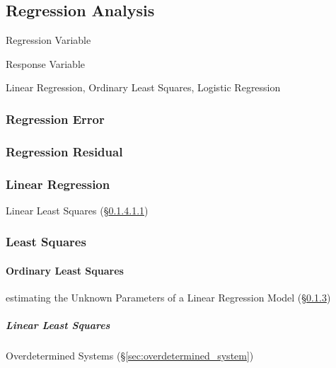 


\subsection{Regression Analysis}\label{sec:regression_analysis}

Regression Variable

Response Variable


Linear Regression, Ordinary Least Squares, Logistic Regression



\subsubsection{Regression Error}\label{sec:regression_error}

\subsubsection{Regression Residual}\label{sec:regression_residual}

\subsubsection{Linear Regression}\label{sec:linear_regression}

Linear Least Squares (\S\ref{sec:linear_least_squares})



\subsubsection{Least Squares}\label{sec:least_squares}

\paragraph{Ordinary Least Squares}\label{sec:ordinary_least_squares}\hfill

estimating the Unknown Parameters of a Linear Regression Model
(\S\ref{sec:linear_regression})



\subparagraph{Linear Least Squares}\label{sec:linear_least_squares}\hfill

Overdetermined Systems (\S\ref{sec:overdetermined_system})

